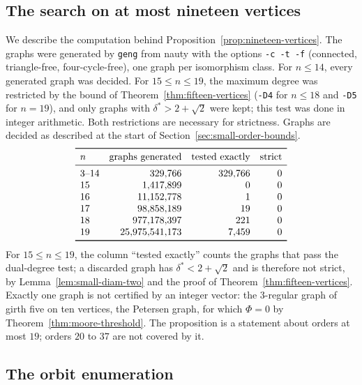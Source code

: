 \documentclass[a4paper,10pt,reqno]{amsart}
\theoremstyle{plain}
\theoremstyle{definition}
\theoremstyle{remark}
\begin{document}
\subsection{The search on at most nineteen vertices}

We describe the computation behind Proposition~\ref{prop:nineteen-vertices}.
The graphs were generated by \texttt{geng} from nauty
\cite{McKayPiperno2014} with the options \texttt{-c -t -f} (connected,
triangle-free, four-cycle-free), one graph per isomorphism class. For
\(n\le14\), every generated graph was decided. For \(15\le n\le19\), the
maximum degree was restricted by the bound of Theorem~\ref{thm:fifteen-vertices}
(\texttt{-D4} for \(n\le18\) and \texttt{-D5} for \(n=19\)), and only graphs
with \(\delta^*>2+\sqrt2\) were kept; this test was done in integer
arithmetic. Both restrictions are necessary for strictness. Graphs are
decided as described at the start of Section~\ref{sec:small-order-bounds}.
\[
\begin{array}{lrrr}
\toprule
n&\text{graphs generated}&\text{tested exactly}&\text{strict}\\
\midrule
3\text{--}14&329{,}766&329{,}766&0\\
15&1{,}417{,}899&0&0\\
16&11{,}152{,}778&1&0\\
17&98{,}858{,}189&19&0\\
18&977{,}178{,}397&221&0\\
19&25{,}975{,}541{,}173&7{,}459&0\\
\bottomrule
\end{array}
\]
For \(15\le n\le19\), the column ``tested exactly'' counts the graphs that
pass the dual-degree test; a discarded graph has \(\delta^*<2+\sqrt2\) and
is therefore not strict, by Lemma~\ref{lem:small-diam-two} and the proof of
Theorem~\ref{thm:fifteen-vertices}. Exactly one graph is not certified by an integer vector: the
\(3\)-regular graph of girth five on ten vertices, the Petersen graph, for
which \(\Phi=0\) by Theorem~\ref{thm:moore-threshold}. The proposition is a statement about orders at most \(19\);
orders \(20\) to \(37\) are not covered by it.

\subsection{The orbit enumeration}
\end{document}
